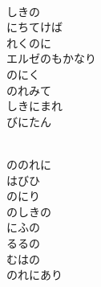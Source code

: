 \documentclass[10pt,b5j]{tarticle} %
\begin{document}
\begin{enumerate}
\begin{minipage}[c]{\blocksize}
    \end{minipage}
    \begin{minipage}[c]{\blocksize}
        
        \vspace{\linespace}
        \item~\\
        しきの\\
        にちてけば\\
        れくのに\\
        エルゼのもかなり\\
        のにく\\
        のれみて\\
        しきにまれ\\
        びにたん
        
    \end{minipage}
    \begin{minipage}[c]{\blocksize}
        
        \vspace{\linespace}
        \item~\\
        ののれに\\
        はびひ\\
        のにり\\
        のしきの\\
        にふの\\
        るるの\\
        むはの\\
        のれにあり
        
    \end{minipage}
    \begin{minipage}[c]{\blocksize}
        

\end{minipage}
\end{enumerate}
\end{document}
